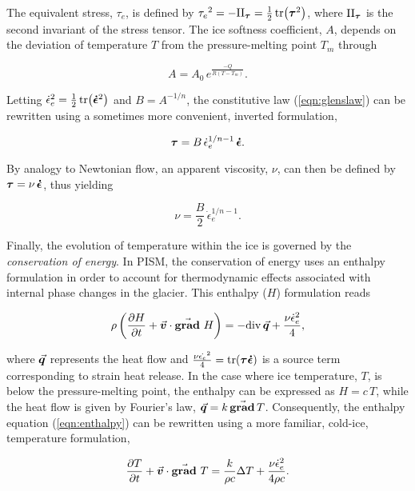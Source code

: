 \documentclass{article}
\newcommand{\vect}[1]{\va*{#1}} %
\newcommand{\tens}[1]{\vb*{#1}} %
\renewcommand{\div}[1]{\mathrm{div}\,#1}            %
\renewcommand{\grad}[1]{\vect{\mathrm{grad}}\,#1}   %
\newcommand{\matdv}[1]{\pdv{#1}{t}+\vect{v}\cdot\grad{}\,#1}  %
\newcommand{\doteps}[0]{\dot{\epsilon}} %
\newcommand{\DST}[0]{\tens{\tau}}       %
\newcommand{\SRT}[0]{\tens{\doteps}}    %
\begin{document}
The equivalent stress, $\tau_e$, is defined by
${\tau_e}^2 = -\mathrm{II}_{\DST} = \frac{1}{2} \tr(\DST^2)$,
where $\mathrm{II}_{\DST}$ is the second invariant of the stress tensor.
The ice softness coefficient, $A$, depends on the deviation of temperature $T$
from the pressure-melting point $T_m$ through

\begin{equation}
    A = A_0\,e^\frac{-Q}{R(T-T_m)}.
\end{equation}

Letting ${\doteps_e}^2 = \frac{1}{2} \tr(\SRT^2)$ and $B=A^{-1/n}$, the
constitutive law (\ref{eqn:glenslaw}) can be rewritten using a sometimes more
convenient, inverted formulation,

\begin{equation}
    \DST = B\,\doteps_e^{1/n-1}\,\SRT.
\end{equation}

By analogy to Newtonian flow, an apparent viscosity, $\nu$, can then be defined
by $\DST = \nu\,\SRT$, thus yielding

\begin{equation}
    \label{eqn:viscosity}
    \nu = \frac{B}{2}\,\doteps_e^{1/n-1}.
\end{equation}

Finally, the evolution of temperature within the ice is governed by the
\emph{conservation of energy}. In PISM, the conservation of energy uses an
enthalpy formulation in order to account for thermodynamic effects associated
with internal phase changes in the glacier. This enthalpy ($H$) formulation
reads

\begin{equation}
    \label{eqn:enthalpy}
    \rho \left(\matdv{H}\right)
        = -\div{\vect{q}} + \frac{\nu\doteps_e^2}{4},
\end{equation}


where $\vect{q}$ represents the heat flow and
${\frac{\nu\dot{\epsilon_e}^2}{4} = \tr(\DST\SRT)}$ is a
source term corresponding to strain heat release. In the case where ice
temperature, $T$, is below the pressure-melting point, the enthalpy can be
expressed as $H=c\,T$, while the heat flow is given by Fourier's law,
$\vect{q} = k\,\grad{T}$. Consequently, the enthalpy equation
(\ref{eqn:enthalpy}) can be rewritten using a more familiar, cold-ice,
temperature formulation,

\begin{equation}
    \label{eqn:temperature}
    \matdv{T} = \frac{k}{\rho c} \Delta T
                + \frac{\nu\doteps_e^2}{4\rho c}.
\end{equation}
\end{document}
